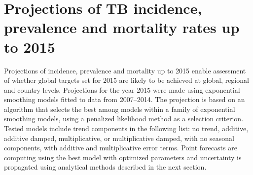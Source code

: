 \section{Projections of TB incidence, prevalence and mortality rates up to 2015} 

Projections of incidence, prevalence and mortality up to 2015 enable assessment of whether global targets set for 2015 are likely to be achieved at global, regional and country levels. Projections for the year 2015 were made using exponential smoothing models fitted to data from 2007–2014. The projection is based on an algorithm that selects the best among models within a family of exponential smoothing models, using a penalized likelihood method as a selection criterion\cite{Hyndman2008-ax}. Tested models include trend components in the following list: no trend, additive, additive damped, multiplicative, or multiplicative damped, with no seasonal components, with additive and multiplicative error terms. Point forecasts are computing using the best model with optimized parameters and uncertainty is propagated using analytical methods described in the next section.

